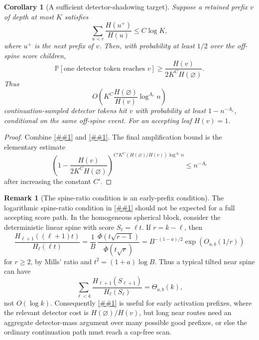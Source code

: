 \documentclass[10pt]{article}
\newcommand{\cref}[1]{\ref{##1}}
\newtheorem{corollary}[theorem]{Corollary}
\theoremstyle{definition}
\newtheorem{remark}[theorem]{Remark}
\newcommand{\Prb}{\mathbb{P}}
\begin{document}
\begin{corollary}[A sufficient detector-shadowing target]\label{cor:detector-shadowing-target}
   Suppose a retained prefix $v$ of depth at most $K$ satisfies
   \[
      \sum_{u\prec v}\frac{H(u^+)}{H(u)}\le C\log K,
   \]
   where $u^+$ is the next prefix of $v$. Then, with probability at least $1/2$ over the off-spine score children,
   \[
      \Prb[\text{one detector token reaches }v]
      \ge
      \frac{H(v)}{2K^C H(\varnothing)}.
   \]
   Thus
   \[
      O\!\left(K^C\frac{H(\varnothing)}{H(v)}\log^{A_c}n\right)
   \]
   continuation-sampled detector tokens hit $v$ with probability at least $1-n^{-A_c}$, conditional on the same off-spine event. For an accepting leaf $H(v)=1$.
\end{corollary}

\begin{proof}
   Combine \cref{lem:detector-inflation} and \cref{lem:off-spine-inflation}. The final amplification bound is the elementary estimate
   \[
      \left(1-\frac{H(v)}{2K^CH(\varnothing)}\right)^{
         C'K^C(H(\varnothing)/H(v))\log^{A_c}n}
      \le
      n^{-A_c}
   \]
   after increasing the constant $C'$.
\end{proof}

\begin{remark}[The spine-ratio condition is an early-prefix condition]\label{rem:linear-spine-ratio}
   The logarithmic spine-ratio condition in \cref{cor:detector-shadowing-target} should not be expected for a full accepting score path. In the homogeneous spherical block, consider the deterministic linear spine with score $S_\ell=\ell t$. If $r=k-\ell$, then
   \[
      \frac{H_{\ell+1}((\ell+1)t)}{H_\ell(\ell t)}
      =
      \frac{1}{B}\,
      \frac{\overline\Phi(t\sqrt{r-1})}
           {\overline\Phi(t\sqrt r)}
      =
      B^{-(1-a)/2}\exp(O_{a,b}(1/r))
   \]
   for $r\ge2$, by Mills' ratio and $t^2=(1+a)\log B$. Thus a typical tilted near spine can have
   \[
      \sum_{\ell<k}\frac{H_{\ell+1}(S_{\ell+1})}{H_\ell(S_\ell)}
      =
      \Theta_{a,b}(k),
   \]
   not $O(\log k)$. Consequently \cref{cor:detector-shadowing-target} is useful for early activation prefixes, where the relevant detector cost is $H(\varnothing)/H(v)$, but long near routes need an aggregate detector-mass argument over many possible good prefixes, or else the ordinary continuation path must reach a cap-free scan.
\end{remark}
\end{document}
